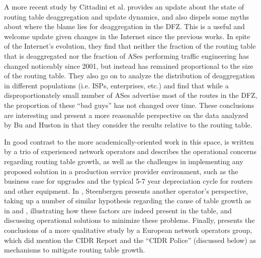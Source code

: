 A more recent study by Cittadini et al. \cite{Cittadini:2010pi} provides an update about the state of routing table deaggregation and update dynamics, and also dispels some myths about where the blame lies for deaggregation in the DFZ. This is a useful and welcome update given changes in the Internet since the previous works. In spite of the Internet's evolution, they find that neither the fraction of the routing table that is deaggregated nor the fraction of ASes performing traffic engineering has changed noticeably since 2001, but instead has remained proportional to the size of the routing table. They also go on to analyze the distribution of deaggregation in different populations (i.e. ISPs, enterprises, etc.) and find that while a disproportionately small number of ASes advertise most of the routes in the DFZ, the proportion of these ``bad guys'' has not changed over time. These conclusions are interesting and present a more reasonable perspective on the data analyzed by Bu and Huston in that they consider the results relative to the routing table. %

In good contrast to the more academically-oriented work in this space, \cite{Zhao:2001ly} is written by a trio of experienced network operators and describes the operational concerns regarding routing table growth, as well as the challenges in implementing any proposed solution in a production service provider environment, such as the business case for upgrades and the typical 5-7 year depreciation cycle for routers and other equipment. In \cite{Steenbergen:2010nx}, Steenbergen presents another operator's perspective, taking up a number of similar hypothesis regarding the cause of table growth as in \cite{Bu:2004fk} and \cite{Cittadini:2010pi}, illustrating how these factors are indeed present in the table, and discussing operational solutions to minimize these problems. Finally, \cite{Smith:2006vn} presents the conclusions of a more qualitative study by a European network operators group, which did mention the CIDR Report and the ``CIDR Police'' (discussed below) as mechanisms to mitigate routing table growth.


